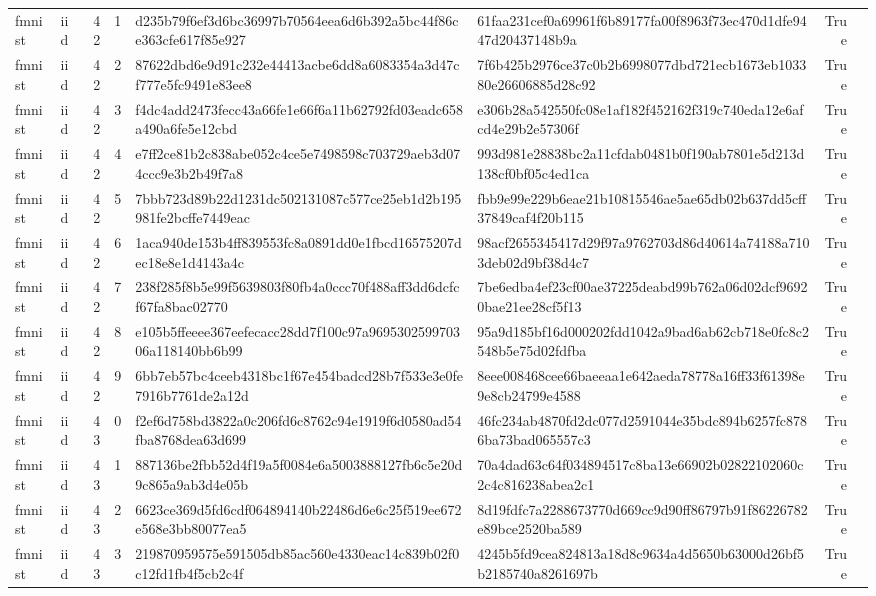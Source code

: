\begin{tabular}{llrrllrl}
fmnist & iid & 42 & 1 & d235b79f6ef3d6bc36997b70564eea6d6b392a5bc44f86ce363cfe617f85e927 & 61faa231cef0a69961f6b89177fa00f8963f73ec470d1dfe9447d20437148b9a & True &  \\
fmnist & iid & 42 & 2 & 87622dbd6e9d91c232e44413acbe6dd8a6083354a3d47cf777e5fc9491e83ee8 & 7f6b425b2976ce37c0b2b6998077dbd721ecb1673eb103380e26606885d28c92 & True &  \\
fmnist & iid & 42 & 3 & f4dc4add2473fecc43a66fe1e66f6a11b62792fd03eadc658a490a6fe5e12cbd & e306b28a542550fc08e1af182f452162f319c740eda12e6afcd4e29b2e57306f & True &  \\
fmnist & iid & 42 & 4 & e7ff2ce81b2c838abe052c4ce5e7498598c703729aeb3d074ccc9e3b2b49f7a8 & 993d981e28838bc2a11cfdab0481b0f190ab7801e5d213d138cf0bf05c4ed1ca & True &  \\
fmnist & iid & 42 & 5 & 7bbb723d89b22d1231dc502131087c577ce25eb1d2b195981fe2bcffe7449eac & fbb9e99e229b6eae21b10815546ae5ae65db02b637dd5cff37849caf4f20b115 & True &  \\
fmnist & iid & 42 & 6 & 1aca940de153b4ff839553fc8a0891dd0e1fbcd16575207dec18e8e1d4143a4c & 98acf2655345417d29f97a9762703d86d40614a74188a7103deb02d9bf38d4c7 & True &  \\
fmnist & iid & 42 & 7 & 238f285f8b5e99f5639803f80fb4a0ccc70f488aff3dd6dcfcf67fa8bac02770 & 7be6edba4ef23cf00ae37225deabd99b762a06d02dcf96920bae21ee28cf5f13 & True &  \\
fmnist & iid & 42 & 8 & e105b5ffeeee367eefecacc28dd7f100c97a969530259970306a118140bb6b99 & 95a9d185bf16d000202fdd1042a9bad6ab62cb718e0fc8c2548b5e75d02fdfba & True &  \\
fmnist & iid & 42 & 9 & 6bb7eb57bc4ceeb4318bc1f67e454badcd28b7f533e3e0fe7916b7761de2a12d & 8eee008468cee66baeeaa1e642aeda78778a16ff33f61398e9e8cb24799e4588 & True &  \\
fmnist & iid & 43 & 0 & f2ef6d758bd3822a0c206fd6c8762c94e1919f6d0580ad54fba8768dea63d699 & 46fc234ab4870fd2dc077d2591044e35bdc894b6257fc8786ba73bad065557c3 & True &  \\
fmnist & iid & 43 & 1 & 887136be2fbb52d4f19a5f0084e6a5003888127fb6c5e20d9c865a9ab3d4e05b & 70a4dad63c64f034894517c8ba13e66902b02822102060c2c4c816238abea2c1 & True &  \\
fmnist & iid & 43 & 2 & 6623ce369d5fd6cdf064894140b22486d6e6c25f519ee672e568e3bb80077ea5 & 8d19fdfc7a2288673770d669cc9d90ff86797b91f86226782e89bce2520ba589 & True &  \\
fmnist & iid & 43 & 3 & 219870959575e591505db85ac560e4330eac14c839b02f0c12fd1fb4f5cb2c4f & 4245b5fd9cea824813a18d8c9634a4d5650b63000d26bf5b2185740a8261697b & True &  \\

\end{tabular}
